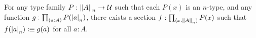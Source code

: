 \documentclass[hott-all.tex]{subfiles}
\begin{document}
% 
% 
% 
% 
% 
% 
\begin{thm}
  For any type family $P:\trunc n A \to \type$ such that each $P(x)$ is an $n$-type, and any function $g : \prd{a:A} P(\tproj n a)$, there
exists a section $f:\prd{x:\trunc n A} P(x)$ such that $f(\tproj n a)\defeq g(a)$ for all $a:A$.
\end{thm}
\end{document}
